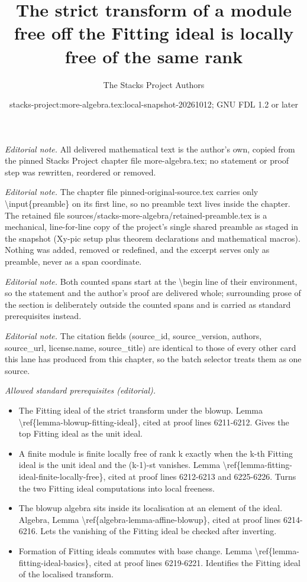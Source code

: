 \documentclass[10pt,a4paper]{amsart}
\title{The strict transform of a module free off the Fitting ideal is locally free of the same rank}
\author{The Stacks Project Authors}
\date{stacks-project:more-algebra.tex:local-snapshot-20261012; GNU FDL 1.2 or later}
\theoremstyle{plain}
\theoremstyle{definition}
\theoremstyle{remark}
\numberwithin{equation}{subsection}
\begin{document}
\maketitle
\setcounter{subsection}{1}
\noindent\textit{Editorial note.} All delivered mathematical text is the author's own, copied from the pinned Stacks Project chapter file more-algebra.tex; no statement or proof step was rewritten, reordered or removed.\par\medskip
\noindent\textit{Editorial note.} The chapter file pinned-original-source.tex carries only \textbackslash{}input\{preamble\} on its first line, so no preamble text lives inside the chapter. The retained file sources/stacks-more-algebra/retained-preamble.tex is a mechanical, line-for-line copy of the project's single shared preamble as staged in the snapshot (Xy-pic setup plus theorem declarations and mathematical macros). Nothing was added, removed or redefined, and the excerpt serves only as preamble, never as a span coordinate.\par\medskip
\noindent\textit{Editorial note.} Both counted spans start at the \textbackslash{}begin line of their environment, so the statement and the author's proof are delivered whole; surrounding prose of the section is deliberately outside the counted spans and is carried as standard prerequisites instead.\par\medskip
\noindent\textit{Editorial note.} The citation fields (source\_id, source\_version, authors, source\_url, license.name, source\_title) are identical to those of every other card this lane has produced from this chapter, so the batch selector treats them as one source.\par\medskip
\noindent\textit{Allowed standard prerequisites (editorial).}\begin{itemize}
\item The Fitting ideal of the strict transform under the blowup. Lemma \textbackslash{}ref\{lemma-blowup-fitting-ideal\}, cited at proof lines 6211-6212. Gives the top Fitting ideal as the unit ideal.
\item A finite module is finite locally free of rank k exactly when the k-th Fitting ideal is the unit ideal and the (k-1)-st vanishes. Lemma \textbackslash{}ref\{lemma-fitting-ideal-finite-locally-free\}, cited at proof lines 6212-6213 and 6225-6226. Turns the two Fitting ideal computations into local freeness.
\item The blowup algebra sits inside its localisation at an element of the ideal. Algebra, Lemma \textbackslash{}ref\{algebra-lemma-affine-blowup\}, cited at proof lines 6214-6216. Lets the vanishing of the Fitting ideal be checked after inverting.
\item Formation of Fitting ideals commutes with base change. Lemma \textbackslash{}ref\{lemma-fitting-ideal-basics\}, cited at proof lines 6219-6221. Identifies the Fitting ideal of the localised transform.
\end{itemize}\medskip
\end{document}
